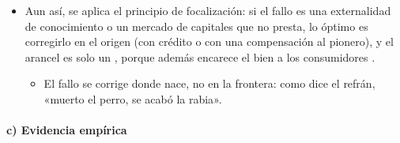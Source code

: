 \documentclass[11pt]{article}
\begin{document}
\begin{itemize}
  \begin{itemize}
  \item con economías \emph{internas} o de \emph{aprendizaje} que se queda la propia empresa, el mercado basta, salvo que el mercado de capitales no preste contra los beneficios futuros: entonces el fallo está en el crédito, y lo óptimo es corregirlo allí;
  \item con economías \emph{externas} o aprendizaje que se difunde a otras empresas, nadie quiere ser el primero, porque pagaría el coste de aprender y los demás se aprovecharían. Hay un fallo de coordinación con equilibrios múltiples, y una protección (o una subvención) que haga rentable entrar a todos a la vez puede estar justificada: con ella, entrar pasa a ser una estrategia dominante, y la protección se levanta cuando el coste medio baja del precio internacional.
  \end{itemize}
\item Aun así, se aplica el principio de focalización: si el fallo es una externalidad de conocimiento o un mercado de capitales que no presta, lo óptimo es corregirlo en el origen (con crédito o con una compensación al pionero), y el arancel es solo un , porque además encarece el bien a los consumidores\nocite{BhagwatiRamaswami1963Domestic,Baldwin1969Case} .
  \begin{itemize}
  \item El fallo se corrige donde nace, no en la frontera: como dice el refrán, «muerto el perro, se acabó la rabia».
  \end{itemize}
\end{itemize}

\paragraph{c) Evidencia empírica}
\end{document}
